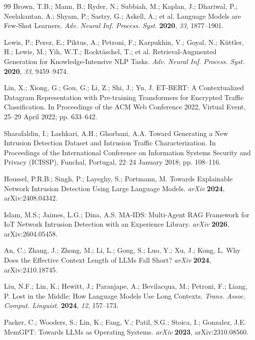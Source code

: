 \documentclass[10pt,a4paper,onecolumn]{article}
\theoremstyle{definition}
\theoremstyle{remark}
\begin{document}
\begin{thebibliography}{99}
\small
{}
Brown, T.B.; Mann, B.; Ryder, N.; Subbiah, M.; Kaplan, J.; Dhariwal, P.; Neelakantan, A.; Shyam, P.; Sastry, G.; Askell, A.; et al. Language Models are Few-Shot Learners. \emph{Adv. Neural Inf. Process. Syst.} \textbf{2020}, \emph{33}, 1877--1901.

Lewis, P.; Perez, E.; Piktus, A.; Petroni, F.; Karpukhin, V.; Goyal, N.; K\"{u}ttler, H.; Lewis, M.; Yih, W.T.; Rockt\"{a}schel, T.; et al. Retrieval-Augmented Generation for Knowledge-Intensive NLP Tasks. \emph{Adv. Neural Inf. Process. Syst.} \textbf{2020}, \emph{33}, 9459--9474.

Lin, X.; Xiong, G.; Gou, G.; Li, Z.; Shi, J.; Yu, J. ET-BERT: A Contextualized Datagram Representation with Pre-training Transformers for Encrypted Traffic Classification. In Proceedings of the ACM Web Conference 2022, Virtual Event, 25--29 April 2022; pp. 633--642.

Sharafaldin, I.; Lashkari, A.H.; Ghorbani, A.A. Toward Generating a New Intrusion Detection Dataset and Intrusion Traffic Characterization. In Proceedings of the International Conference on Information Systems Security and Privacy (ICISSP), Funchal, Portugal, 22--24 January 2018; pp. 108--116.

Houssel, P.R.B.; Singh, P.; Layeghy, S.; Portmann, M. Towards Explainable Network Intrusion Detection Using Large Language Models. \emph{arXiv} \textbf{2024}, arXiv:2408.04342.

Islam, M.S.; Jaimes, L.G.; Dina, A.S. MA-IDS: Multi-Agent RAG Framework for IoT Network Intrusion Detection with an Experience Library. \emph{arXiv} \textbf{2026}, arXiv:2604.05458.

An, C.; Zhang, J.; Zhong, M.; Li, L.; Gong, S.; Luo, Y.; Xu, J.; Kong, L. Why Does the Effective Context Length of LLMs Fall Short? \emph{arXiv} \textbf{2024}, arXiv:2410.18745.

Liu, N.F.; Lin, K.; Hewitt, J.; Paranjape, A.; Bevilacqua, M.; Petroni, F.; Liang, P. Lost in the Middle: How Language Models Use Long Contexts. \emph{Trans. Assoc. Comput. Linguist.} \textbf{2024}, \emph{12}, 157--173.

Packer, C.; Wooders, S.; Lin, K.; Fang, V.; Patil, S.G.; Stoica, I.; Gonzalez, J.E. MemGPT: Towards LLMs as Operating Systems. \emph{arXiv} \textbf{2023}, arXiv:2310.08560.


\end{thebibliography}
\end{document}
